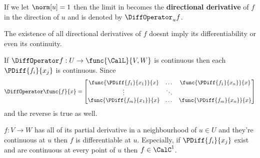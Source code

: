 \begin{definition}
    If we let \(\norm[u] = 1\) then the limit in  becomes the \textbf{directional derivative} of \(f\) in the direction of \(u\) and is denoted by \(\DiffOperator_u f\).
\end{definition}

\begin{remark}
    The existence of all directional derivatives of \(f\) doesnt imply its differentiability or even its continuity.
\end{remark}

\begin{remark}
    If \(\DiffOperator f: U \to \func{\CalL}{V,W}\) is continuous then each \(\PDiff{f_i}{x_j}\) is continuous. Since
    \begin{equation*}
        \DiffOperator \func{f}{x} = \begin{bmatrix}
            \func{\PDiff{f_1}{x_1}}{x} & \dots  & \func{\PDiff{f_1}{x_n}}{x} \\
            \vdots                     & \ddots &                            \\
            \func{\PDiff{f_m}{x_1}}{x} & \dots  & \func{\PDiff{f_m}{x_n}}{x}
        \end{bmatrix}
    \end{equation*}
    and the reverse is true as well.
\end{remark}

\begin{theorem}
    \(f : V \to W\) has all of its partial derivative in a neighbourhood of \(u \in U\) and they're continuous at \(u\) then \(f\) is differentiable at \(u\). Especially, if \(\PDiff{f_i}{x_j}\) exist and are continuous at every point of \(u\) then \(f \in \CalC^1\).
\end{theorem}


